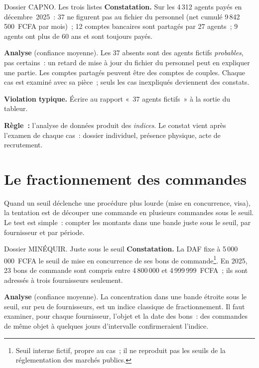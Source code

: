 \begin{boxscenario}{Dossier CAPNO. Les trois listes}
\textbf{Constatation.} Sur les 4\,312 agents payés en décembre~2025~:
37 ne figurent pas au fichier du personnel (net cumulé
9\,842\,500~FCFA par mois)~; 12 comptes bancaires sont partagés par 27
agents~; 9 agents ont plus de 60 ans et sont toujours payés.

\medskip
\textbf{Analyse} (confiance moyenne). Les 37 absents sont des agents
fictifs \emph{probables}, pas certains~: un retard de mise à jour du
fichier du personnel peut en expliquer une partie. Les comptes partagés
peuvent être des comptes de couples. Chaque cas est examiné avec sa
pièce~; seuls les cas inexpliqués deviennent des constats.
\end{boxscenario}

\begin{boxalert}
\textbf{Violation typique.} Écrire au rapport «~37 agents fictifs~» à la
sortie du tableur.

\smallskip
\textbf{Règle~:} l'analyse de données produit des \emph{indices}. Le
constat vient après l'examen de chaque cas~: dossier individuel,
présence physique, acte de recrutement.
\end{boxalert}

\separateur

\section{Le fractionnement des commandes}
\label{sec:c12-fractionnement}

Quand un seuil déclenche une procédure plus lourde (mise en concurrence,
visa), la tentation est de découper une commande en plusieurs commandes
sous le seuil. Le test est simple~: compter les montants dans une bande
juste sous le seuil, par fournisseur et par période.

\begin{boxscenario}{Dossier MINÉQUIR. Juste sous le seuil}
\textbf{Constatation.} La DAF fixe à 5\,000\,000~FCFA le seuil de mise en
concurrence de ses bons de commande\footnote{Seuil interne fictif, propre
au cas~; il ne reproduit pas les seuils de la réglementation des marchés
publics.}. En 2025, 23 bons de commande sont compris entre 4\,800\,000 et
4\,999\,999~FCFA~; ils sont adressés à trois fournisseurs seulement.

\medskip
\textbf{Analyse} (confiance moyenne). La concentration dans une bande
étroite sous le seuil, sur peu de fournisseurs, est un indice classique
de fractionnement. Il faut examiner, pour chaque fournisseur, l'objet et
la date des bons~: des commandes de même objet à quelques jours
d'intervalle confirmeraient l'indice.
\end{boxscenario}

